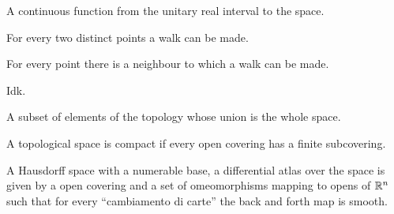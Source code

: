 \begin{multicols*}{3}
  A continuous function from the unitary real interval to the space.

  For every two distinct points a walk can be made.

  For every point there is a neighbour to which a walk can be made.

  Idk.

  A subset of elements of the topology whose union is the whole space.

  A topological space is compact if every open covering has a finite subcovering.

  A Hausdorff space with a numerable base, a differential atlas over the space is given by
  a open covering and a set of omeomorphisms mapping to opens of $\mathbb{R}^n$ such that for every
  ``cambiamento di carte'' the back and forth map is smooth.

\end{multicols*}


